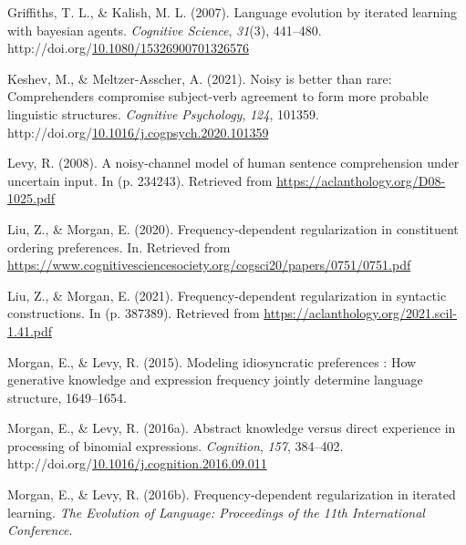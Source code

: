 \documentclass[10pt, letterpaper]{article}
\newenvironment{CSLReferences}%
  {}%
  {\par}
\begin{document}
\begin{CSLReferences}{1}{0}
\leavevmode{}%
Griffiths, T. L., \& Kalish, M. L. (2007). Language evolution by
iterated learning with bayesian agents. \emph{Cognitive Science},
\emph{31}(3), 441--480.
http://doi.org/\href{https://doi.org/10.1080/15326900701326576}{10.1080/15326900701326576}

\leavevmode{}%
Keshev, M., \& Meltzer-Asscher, A. (2021). Noisy is better than rare:
Comprehenders compromise subject-verb agreement to form more probable
linguistic structures. \emph{Cognitive Psychology}, \emph{124}, 101359.
http://doi.org/\href{https://doi.org/10.1016/j.cogpsych.2020.101359}{10.1016/j.cogpsych.2020.101359}

\leavevmode{}%
Levy, R. (2008). A noisy-channel model of human sentence comprehension
under uncertain input. In (p. 234243). Retrieved from
\url{https://aclanthology.org/D08-1025.pdf}

\leavevmode{}%
Liu, Z., \& Morgan, E. (2020). Frequency-dependent regularization in
constituent ordering preferences. In. Retrieved from
\url{https://www.cognitivesciencesociety.org/cogsci20/papers/0751/0751.pdf}

\leavevmode{}%
Liu, Z., \& Morgan, E. (2021). Frequency-dependent regularization in
syntactic constructions. In (p. 387389). Retrieved from
\url{https://aclanthology.org/2021.scil-1.41.pdf}

\leavevmode{}%
Morgan, E., \& Levy, R. (2015). Modeling idiosyncratic preferences : How
generative knowledge and expression frequency jointly determine language
structure, 1649--1654.

\leavevmode{}%
Morgan, E., \& Levy, R. (2016a). Abstract knowledge versus direct
experience in processing of binomial expressions. \emph{Cognition},
\emph{157}, 384--402.
http://doi.org/\href{https://doi.org/10.1016/j.cognition.2016.09.011}{10.1016/j.cognition.2016.09.011}

\leavevmode{}%
Morgan, E., \& Levy, R. (2016b). Frequency-dependent regularization in
iterated learning. \emph{The Evolution of Language: Proceedings of the
11th International Conference}.


\end{CSLReferences}
\end{document}
